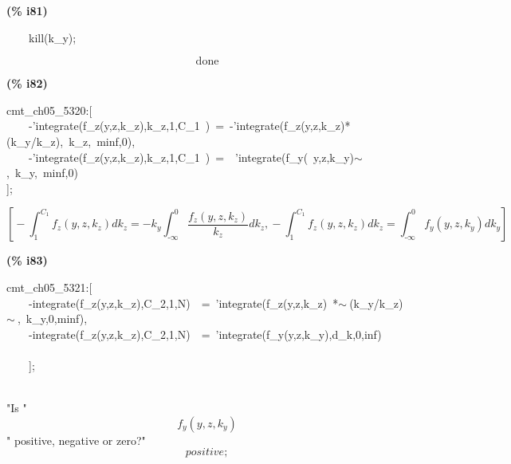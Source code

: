 \documentclass[fleqn]{article}
\begin{document}
\noindent
\begin{minipage}[t]{4.000000em}\color{red}\bfseries
(\% i81)	
\end{minipage}
\begin{minipage}[t]{\textwidth}\color{blue}
\ \ \ \ kill(k\_y);
\end{minipage}
\[\displaystyle \tag{\% o81} 
\ensuremath{\mathrm{done}}\mbox{}
\]


\noindent
\begin{minipage}[t]{4.000000em}\color{red}\bfseries
(\% i82)	
\end{minipage}
\begin{minipage}[t]{\textwidth}\color{blue}
cmt\_ch05\_5320:[\\
\ \ \ \ -'integrate(f\_z(y,z,k\_z),k\_z,1,C\_1\ )\ =\ -'integrate(f\_z(y,z,k\_z)*(k\_y/k\_z),\ k\_z,\ minf,0),\\
\ \ \ \ -'integrate(f\_z(y,z,k\_z),k\_z,1,C\_1\ )\ =\ \ 'integrate(f\_y(\ y,z,k\_y)\ensuremath{\sim\ },\ k\_y,\ minf,0)\\
];
\end{minipage}
\[\displaystyle \tag{\% o82} 
\operatorname{[}-\int_{1}^{{C_1}}{\left. {f_z}\left( y\operatorname{,}z\operatorname{,}{k_z}\right) d{k_z}\right.}=-{k_y} \int_{\operatorname{-}\infty }^{0}{\left. \frac{{f_z}\left( y\operatorname{,}z\operatorname{,}{k_z}\right) }{{k_z}}d{k_z}\right.}\operatorname{,}-\int_{1}^{{C_1}}{\left. {f_z}\left( y\operatorname{,}z\operatorname{,}{k_z}\right) d{k_z}\right.}=\int_{\operatorname{-}\infty }^{0}{\left. {f_y}\left( y\operatorname{,}z\operatorname{,}{k_y}\right) d{k_y}\right.}\operatorname{]}\mbox{}
\]


\noindent
\begin{minipage}[t]{4.000000em}\color{red}\bfseries
(\% i83)	
\end{minipage}
\begin{minipage}[t]{\textwidth}\color{blue}
cmt\_ch05\_5321:[\\
\ \ \ \ -integrate(f\_z(y,z,k\_z),C\_2,1,N)\ \ =\ 'integrate(f\_z(y,z,k\_z)\ *\ensuremath{\sim\ }(k\_y/k\_z)\ensuremath{\sim\ },\ k\_y,0,minf),\\
\ \ \ \ -integrate(f\_z(y,z,k\_z),C\_2,1,N)\ \ =\ 'integrate(f\_y(y,z,k\_y),d\_k,0,inf)\\
\ \ \ \ \\
\ \ \ \ ];
\end{minipage}
\mbox{}\\"Is "
\[\displaystyle {f_y}\left( y\operatorname{,}z\operatorname{,}{k_y}\right) \mbox{}
\]" positive, negative or zero?"
\[\displaystyle positive;\mbox{}\]
\end{document}
